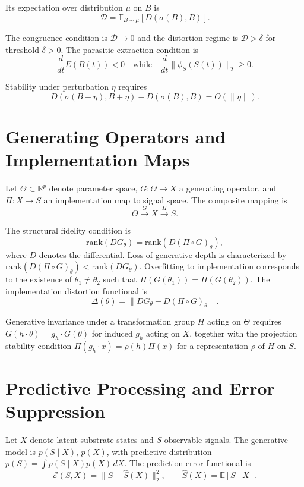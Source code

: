\documentclass[11pt]{article}
\begin{document}
Its expectation over distribution $\mu$ on $B$ is
\[
\mathcal{D} = \mathbb{E}_{B \sim \mu} \left[ D(\sigma(B),B) \right].
\]

The congruence condition is $\mathcal{D} \to 0$ and the distortion regime is $\mathcal{D} > \delta$ for threshold $\delta > 0$. The parasitic extraction condition is
\[
\frac{d}{dt}E(B(t)) < 0 \quad \text{while} \quad \frac{d}{dt}\|\phi_S(S(t))\|_2 \ge 0.
\]

Stability under perturbation $\eta$ requires
\[
D(\sigma(B+\eta),B+\eta) - D(\sigma(B),B) = O(\|\eta\|).
\]

\section{Generating Operators and Implementation Maps}

Let $\Theta \subset \mathbb{R}^p$ denote parameter space, $G : \Theta \to X$ a generating operator, and $\Pi : X \to S$ an implementation map to signal space. The composite mapping is
\[
\Theta \xrightarrow{G} X \xrightarrow{\Pi} S.
\]

The structural fidelity condition is
\[
\mathrm{rank}(DG_\theta) = \mathrm{rank}(D(\Pi \circ G)_\theta),
\]
where $D$ denotes the differential. Loss of generative depth is characterized by $\mathrm{rank}(D(\Pi \circ G)_\theta) < \mathrm{rank}(DG_\theta)$. Overfitting to implementation corresponds to the existence of $\theta_1 \ne \theta_2$ such that $\Pi(G(\theta_1)) = \Pi(G(\theta_2))$. The implementation distortion functional is
\[
\Delta(\theta) = \| DG_\theta - D(\Pi \circ G)_\theta \|.
\]

Generative invariance under a transformation group $H$ acting on $\Theta$ requires $G(h \cdot \theta) = g_h \cdot G(\theta)$ for induced $g_h$ acting on $X$, together with the projection stability condition $\Pi(g_h \cdot x) = \rho(h)\Pi(x)$ for a representation $\rho$ of $H$ on $S$.

\section{Predictive Processing and Error Suppression}

Let $X$ denote latent substrate states and $S$ observable signals. The generative model is $p(S \mid X)$, $p(X)$, with predictive distribution $p(S) = \int p(S \mid X)p(X)\, dX$. The prediction error functional is
\[
\mathcal{E}(S,X) = \| S - \hat{S}(X) \|_2^2, \qquad \hat{S}(X) = \mathbb{E}[S \mid X].
\]
\end{document}
